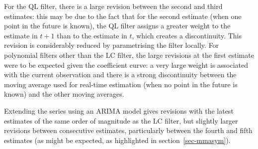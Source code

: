 \documentclass[
]{article}
\newcommand\1{\mathds{1}}
\begin{document}
For the QL filter, there is a large revision between the second and
third estimates: this may be due to the fact that for the second
estimate (when one point in the future is known), the QL filter assigns
a greater weight to the estimate in \(t+1\) than to the estimate in
\(t\), which creates a discontinuity. This revision is considerably
reduced by parametrising the filter locally. For polynomial filters
other than the LC filter, the large revisions at the first estimate were
to be expected given the coefficient curve: a very large weight is
associated with the current observation and there is a strong
discontinuity between the moving average used for real-time estimation
(when no point in the future is known) and the other moving averages.

Extending the series using an ARIMA model gives revisions with the
latest estimates of the same order of magnitude as the LC filter, but
slightly larger revisions between consecutive estimates, particularly
between the fourth and fifth estimates (as might be expected, as
highlighted in section~\ref{sec-mmasym}).
\end{document}
